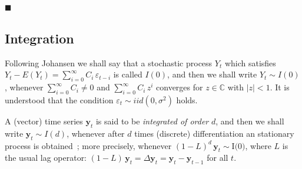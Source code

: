 $\blacksquare$

\newpage
\subsection{Integration}

Following Johansen \cite{johansen1995} we shall say that a stochastic process
$Y_t$ which satisfies $Y_t-E(Y_t) = \sum_{i=0}^\infty C_i\,\varepsilon_{t-i}$ is
called $I(0)$, and then we shall write $Y_t\sim I(0)$, whenever
$\sum_{i=0}^\infty C_i \neq 0$ and $\sum_{i=0}^\infty C_i\,z^i$ converges for
$z\in\mathbb{C}$ with $|z|<1$.  It is understood that the condition
$\varepsilon_t\sim iid(0,\sigma^2)$ holds.

A (vector) time series $\mathbf{y}_t$ is said to be {\em integrated of order\/}
$d$, and then we shall write $\mathbf{y}_t\sim I(d)$, whenever after $d$ times
(discrete) differentiation an stationary process is
obtained~\cite{banerjee1993};
more precisely, whenever
$(1-L)^d\,\mathbf{y}_t\sim\text{I(0)}$, where $L$ is the usual lag operator:
$(1-L)\,\mathbf{y}_t = \Delta\mathbf{y}_t = \mathbf{y}_t-\mathbf{y}_{t-1}$ for
all $t$.  

